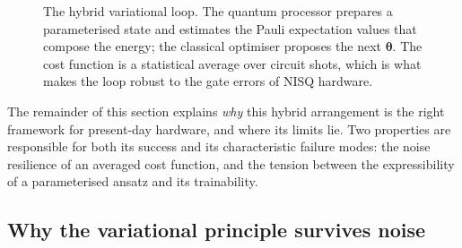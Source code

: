 \begin{figure}[htbp]
\centering
{}
\caption{The hybrid variational loop. The quantum processor prepares a
  parameterised state and estimates the Pauli expectation values that
  compose the energy; the classical optimiser proposes the next
  $\bm{\theta}$. The cost function is a statistical average over circuit
  shots, which is what makes the loop robust to the gate errors of NISQ
  hardware.}
\label{fig:vqe_loop}
\end{figure}

The remainder of this section explains \emph{why} this hybrid arrangement
is the right framework for present-day hardware, and where its limits
lie. Two properties are responsible for both its success and its
characteristic failure modes: the noise resilience of an averaged cost
function, and the tension between the expressibility of a parameterised
ansatz and its trainability.

\subsection{Why the variational principle survives noise}
\label{sec:vqa_noise}

